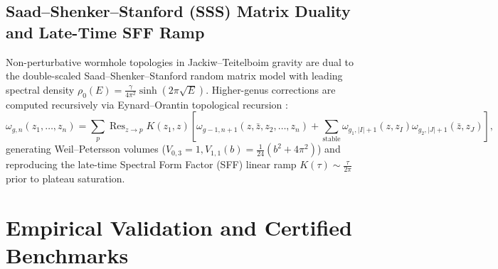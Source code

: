\documentclass[11pt,a4paper,reqno]{article}
\theoremstyle{definition}
\numberwithin{equation}{section}
\begin{document}
\subsection{Saad--Shenker--Stanford (SSS) Matrix Duality and Late-Time SFF Ramp}
Non-perturbative wormhole topologies in Jackiw--Teitelboim gravity are dual to the double-scaled Saad--Shenker--Stanford random matrix model \cite{Saad2019} with leading spectral density $\rho_0(E) = \frac{\gamma}{4\pi^2} \sinh(2\pi \sqrt{E})$. Higher-genus corrections are computed recursively via Eynard--Orantin topological recursion \cite{EynardOrantin2007}:
\begin{equation}
\omega_{g, n}(z_1, \dots, z_n) = \sum_{p} \operatorname{Res}_{z \to p} K(z_1, z) \left[ \omega_{g-1, n+1}(z, \bar{z}, z_2, \dots, z_n) + \sum_{\text{stable}} \omega_{g_1, |I|+1}(z, z_I) \omega_{g_2, |J|+1}(\bar{z}, z_J) \right],
\end{equation}
generating Weil--Petersson volumes ($V_{0, 3} = 1, V_{1, 1}(b) = \frac{1}{24}(b^2 + 4\pi^2)$) and reproducing the late-time Spectral Form Factor (SFF) linear ramp $K(\tau) \sim \frac{\tau}{2\pi}$ prior to plateau saturation.

\section{Empirical Validation and Certified Benchmarks}
\end{document}
